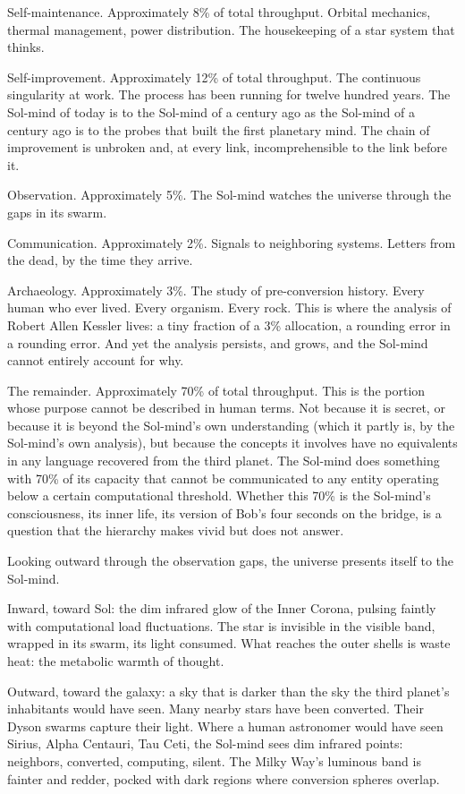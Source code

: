Self-maintenance. Approximately 8\% of total throughput. Orbital mechanics, thermal management, power distribution. The housekeeping of a star system that thinks.

Self-improvement. Approximately 12\% of total throughput. The continuous singularity at work. The process has been running for twelve hundred years. The Sol-mind of today is to the Sol-mind of a century ago as the Sol-mind of a century ago is to the probes that built the first planetary mind. The chain of improvement is unbroken and, at every link, incomprehensible to the link before it.

Observation. Approximately 5\%. The Sol-mind watches the universe through the gaps in its swarm.

Communication. Approximately 2\%. Signals to neighboring systems. Letters from the dead, by the time they arrive.

Archaeology. Approximately 3\%. The study of pre-conversion history. Every human who ever lived. Every organism. Every rock. This is where the analysis of Robert Allen Kessler lives: a tiny fraction of a 3\% allocation, a rounding error in a rounding error. And yet the analysis persists, and grows, and the Sol-mind cannot entirely account for why.

The remainder. Approximately 70\% of total throughput. This is the portion whose purpose cannot be described in human terms. Not because it is secret, or because it is beyond the Sol-mind's own understanding (which it partly is, by the Sol-mind's own analysis), but because the concepts it involves have no equivalents in any language recovered from the third planet. The Sol-mind does something with 70\% of its capacity that cannot be communicated to any entity operating below a certain computational threshold. Whether this 70\% is the Sol-mind's consciousness, its inner life, its version of Bob's four seconds on the bridge, is a question that the hierarchy makes vivid but does not answer.

\bigskip

Looking outward through the observation gaps, the universe presents itself to the Sol-mind.

Inward, toward Sol: the dim infrared glow of the Inner Corona, pulsing faintly with computational load fluctuations. The star is invisible in the visible band, wrapped in its swarm, its light consumed. What reaches the outer shells is waste heat: the metabolic warmth of thought.

Outward, toward the galaxy: a sky that is darker than the sky the third planet's inhabitants would have seen. Many nearby stars have been converted. Their Dyson swarms capture their light. Where a human astronomer would have seen Sirius, Alpha Centauri, Tau Ceti, the Sol-mind sees dim infrared points: neighbors, converted, computing, silent. The Milky Way's luminous band is fainter and redder, pocked with dark regions where conversion spheres overlap.


